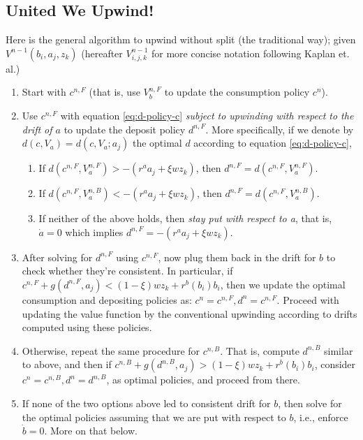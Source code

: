 \documentclass[11pt]{article}
\begin{document}
\subsection{United We Upwind!}
\label{sec:orga0f0c98}
Here is the general algorithm to upwind without split (the traditional way); given \(V^{n-1}(b_i,a_j,z_k)\) (hereafter \(V_{i,j,k}^{n-1}\) for more concise notation following Kaplan et. al.)
\begin{enumerate}
\item Start with \(c^{n,F}\) (that is, use \(V_b^{n,F}\) to update the consumption policy \(c^n\)).
\item Use \(c^{n,F}\) with equation \eqref{eq:d-policy-c} \emph{subject to upwinding with respect to the drift of \(a\)} to update the deposit policy \(d^{n,F}\). More specifically, if we denote by \(d(c,V_a)=d(c,V_a;a_j)\) the optimal \(d\) according to equation \eqref{eq:d-policy-c},
\begin{enumerate}
\item If \(d(c^{n,F}, V_a^{n,F}) > -(r^a a_j + \xi w z_k)\), then \(d^{n,F} = d(c^{n,F}, V_{a}^{n,F})\).
\item If \(d(c^{n,F}, V_a^{n,B}) < -(r^a a_j + \xi w z_k)\), then \(d^{n,F} = d(c^{n,F}, V_{a}^{n,B})\).
\item If neither of the above holds, then \emph{stay put with respect to a}, that is, \(\dot{a} = 0\) which implies \(d^{n,F} = - (r^a a_j + \xi w z_k)\).
\end{enumerate}
\item After solving for \(d^{n,F}\) using \(c^{n,F}\), now plug them back in the drift for \(b\) to check whether they're consistent. In particular, if \(c^{n,F} + g(d^{n,F}, a_j) < (1-\xi) w z_k + r^b(b_i) b_i\), then we update the optimal consumption and depositing policies as: \(c^n = c^{n,F}, d^n = c^{n,F}\). Proceed with updating the value function by the conventional upwinding according to drifts computed using these policies.
\item Otherwise, repeat the same procedure for \(c^{n,B}\). That is, compute \(d^{n,B}\) similar to above, and then if \(c^{n,B} + g(d^{n,B}, a_j) > (1-\xi) w z_k + r^b(b_i) b_i\), consider \(c^n = c^{n,B}, d^n = d^{n,B}\), as optimal policies, and proceed from there.
\item If none of the two options above led to consistent drift for \(b\), then solve for the optimal policies assuming that we are put with respect to \(b\), i.e., enforce \(\dot{b} = 0\). More on that below.
\end{enumerate}
\end{document}
